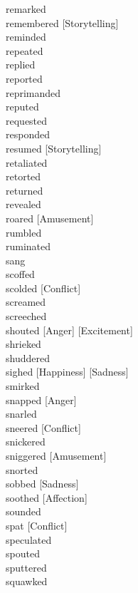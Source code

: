 \documentclass[a4paper,12pt,fleqn]{book}\usepackage{polyglossia}\setdefaultlanguage[babelshorthands=true]{russian}\setotherlanguage{english}\defaultfontfeatures{Ligatures=TeX,Mapping=tex-text}\usepackage{xcolor}\newcommand{\ml}[3]{#2}
\begin{document}
{remarked \hfill \\
remembered [Storytelling] \hfill \\
reminded \hfill \\
repeated \hfill \\
replied \hfill \\
reported \hfill \\
reprimanded \hfill \\
reputed \hfill \\
requested \hfill \\
responded \hfill \\
resumed [Storytelling] \hfill \\
retaliated \hfill \\
retorted \hfill \\
returned \hfill \\
revealed \hfill \\
roared [Amusement] \hfill \\
rumbled \hfill \\
ruminated \hfill \\
sang \hfill \\
scoffed \hfill \\
scolded [Conflict] \hfill \\
screamed \hfill \\
screeched \hfill \\
shouted [Anger] [Excitement] \hfill \\
shrieked \hfill \\
shuddered \hfill \\
sighed [Happiness] [Sadness] \hfill \\
smirked \hfill \\
snapped [Anger] \hfill \\
snarled \hfill \\
sneered [Conflict] \hfill \\
snickered \hfill \\
sniggered [Amusement] \hfill \\
snorted \hfill \\
sobbed [Sadness] \hfill \\
soothed [Affection] \hfill \\
sounded \hfill \\
spat [Conflict] \hfill \\
speculated \hfill \\
spouted \hfill \\
sputtered \hfill \\
squawked \hfill \\
}
\end{document}
